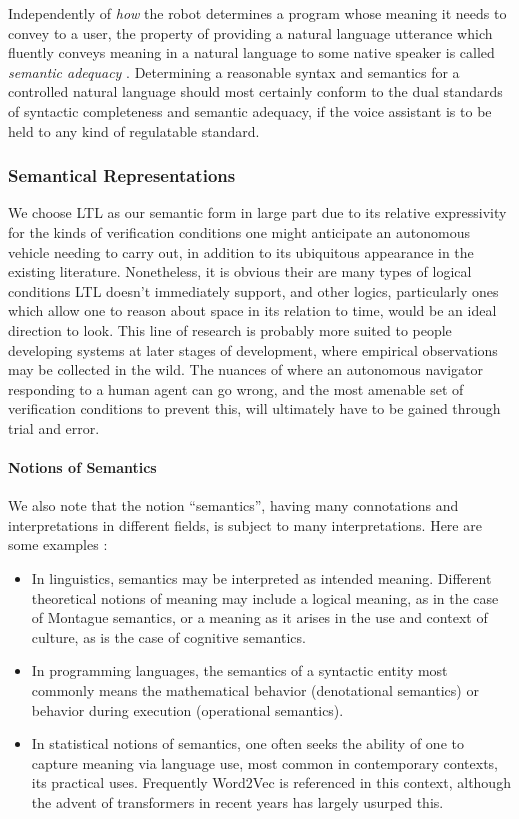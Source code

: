 \documentclass{article}
\begin{document}
Independently of \emph{how} the robot determines a program whose meaning it
needs to convey to a user, the property of providing a natural language
utterance which fluently conveys meaning in a natural language to some native
speaker is called \emph{semantic adequacy} \cite{macmillan2021}. Determining a
reasonable syntax and semantics for a controlled natural language should most
certainly conform to the dual standards of syntactic completeness and semantic
adequacy, if the voice assistant is to be held to any kind of regulatable
standard.


\subsubsection{Semantical Representations}

We choose LTL as our semantic form in large part due to its relative
expressivity for the kinds of verification conditions one might anticipate an
autonomous vehicle needing to carry out, in addition to its ubiquitous
appearance in the existing literature. Nonetheless, it is obvious their are many
types of logical conditions LTL doesn't immediately support, and other logics,
particularly ones which allow one to reason about space in its relation to time,
would be an ideal direction to look. This line of research is probably more
suited to people developing systems at later stages of development, where
empirical observations may be collected in the wild. The nuances of where an
autonomous navigator responding to a human agent can go wrong, and the most
amenable set of verification conditions to prevent this, will ultimately have to
be gained through trial and error.

\paragraph{Notions of Semantics}

We also note that the notion ``semantics'', having many connotations and interpretations in
different fields, is subject to many interpretations. Here are some examples :

\begin{itemize}

\item In linguistics, semantics may be interpreted as intended meaning.
Different theoretical notions of meaning may include a logical meaning, as in
the case of Montague semantics, or a meaning as it arises in the use and context
of culture, as is the case of cognitive semantics.
\item In programming languages, the semantics of a syntactic entity most
commonly means the mathematical behavior (denotational semantics) or behavior
during execution (operational semantics).
\item In statistical notions of semantics, one often seeks the ability of one to
capture meaning via language use, most common in contemporary contexts, its
practical uses. Frequently Word2Vec \cite{word2vec} is referenced in this context,
although the advent of transformers in recent years has largely usurped this.
\end{itemize}
\end{document}
